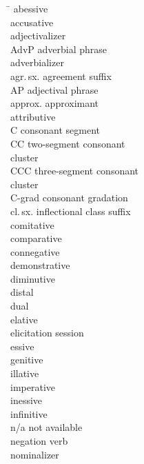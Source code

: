 \begin{multicols}{2}
\begin{tabbing}
\TABh \= \kill
{}	\> abessive \\
	\> accusative \\
	\> adjectivalizer \\
AdvP	\>adverbial phrase\\
	\> adverbializer \\
agr.\,sx.	\> agreement suffix \\
AP		\>adjectival phrase\\
approx.	\>approximant\\
 	\> attributive\\
C		\>consonant segment\\
CC		\>two-segment consonant \\\> cluster\\
CCC		\>three-segment consonant \\\> cluster\\
C-grad	\> consonant gradation \\
cl.\,sx.	\> inflectional class suffix \\
	\> comitative \\
	\> comparative \\
\> connegative \\
	\> demonstrative\\
	\> diminutive \\
	\> distal \\
	\> dual \\
	\> elative \\
		\> elicitation session \\
	\> essive \\
	\> genitive \\
	\> illative \\
	\> imperative \\
	\> inessive \\
	\> infinitive \\
n/a	\> not available \\
	\> negation verb \\
	\> nominalizer \\

\end{tabbing}
\end{multicols}
